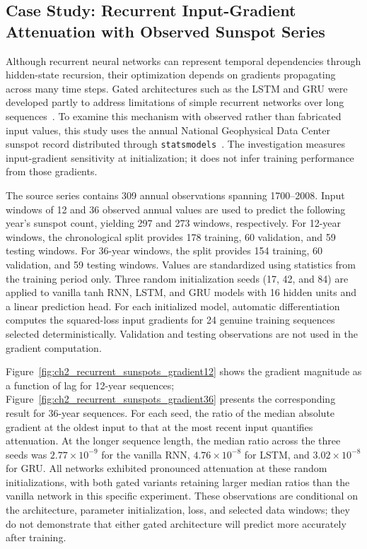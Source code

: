 \subsection{Case Study: Recurrent Input-Gradient Attenuation with Observed Sunspot Series}
\label{sec:ch2_recurrent_sunspot_gradient}

Although recurrent neural networks can represent temporal dependencies through hidden-state recursion, their optimization depends on gradients propagating across many time steps. Gated architectures such as the LSTM and GRU were developed partly to address limitations of simple recurrent networks over long sequences~\cite{Hochreiter:1997,Cho:2014}. To examine this mechanism with observed rather than fabricated input values, this study uses the annual National Geophysical Data Center sunspot record distributed through \texttt{statsmodels}~\cite{Sunspots:Statsmodels}. The investigation measures input-gradient sensitivity at initialization; it does not infer training performance from those gradients.

The source series contains 309 annual observations spanning 1700--2008. Input windows of 12 and 36 observed annual values are used to predict the following year's sunspot count, yielding 297 and 273 windows, respectively. For 12-year windows, the chronological split provides 178 training, 60 validation, and 59 testing windows. For 36-year windows, the split provides 154 training, 60 validation, and 59 testing windows. Values are standardized using statistics from the training period only. Three random initialization seeds (17, 42, and 84) are applied to vanilla tanh RNN, LSTM, and GRU models with 16 hidden units and a linear prediction head. For each initialized model, automatic differentiation computes the squared-loss input gradients for 24 genuine training sequences selected deterministically. Validation and testing observations are not used in the gradient computation.

Figure~\ref{fig:ch2_recurrent_sunspots_gradient12} shows the gradient magnitude as a function of lag for 12-year sequences; Figure~\ref{fig:ch2_recurrent_sunspots_gradient36} presents the corresponding result for 36-year sequences. For each seed, the ratio of the median absolute gradient at the oldest input to that at the most recent input quantifies attenuation. At the longer sequence length, the median ratio across the three seeds was $2.77\times 10^{-9}$ for the vanilla RNN, $4.76\times10^{-8}$ for LSTM, and $3.02\times10^{-8}$ for GRU. All networks exhibited pronounced attenuation at these random initializations, with both gated variants retaining larger median ratios than the vanilla network in this specific experiment. These observations are conditional on the architecture, parameter initialization, loss, and selected data windows; they do not demonstrate that either gated architecture will predict more accurately after training.

